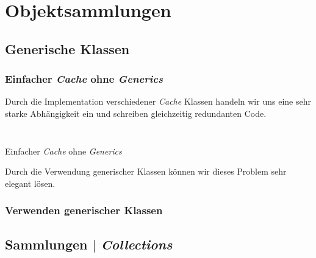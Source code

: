 \section{Objektsammlungen}
\label{sec:collections}

\subsection{Generische Klassen}
\label{subsec:generics}

\begin{frame}[fragile]
    \frametitle<presentation>{Einfacher \emph{Cache} ohne \emph{Generics}}
\end{frame}


\mode*
Durch die Implementation verschiedener \emph{Cache} Klassen handeln wir
uns eine sehr starke Abhängigkeit ein und schreiben gleichzeitig redundanten
Code.


\begin{listing}[ht]
    \centering
    \begin{minipage}{0.45\textwidth}
        \inputminted[frame=single,linenos]{java}{../java/generics/CacheString.java}
    \end{minipage}
    \begin{minipage}{0.45\textwidth}
        \inputminted[frame=single]{java}{../java/generics/CacheShirt.java}
    \end{minipage}
    \caption{Einfacher \emph{Cache} ohne \emph{Generics}}
    \label{lst:non-generic-classes}
\end{listing}

Durch die Verwendung generischer Klassen können wir dieses Problem sehr elegant
lösen.


\begin{frame}[fragile]
	\frametitle<presentation>{Verwenden generischer Klassen}
\end{frame}


\subsection{Sammlungen $|$ \emph{Collections}}
\label{subsec:collections}

